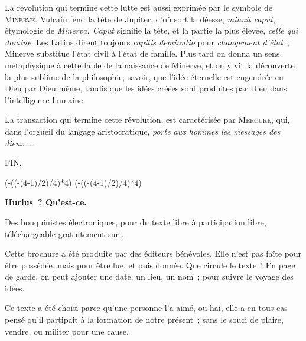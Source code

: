 \documentclass[french,twoside]{book} %
\newcommand\chapterclose{} %
\def\truncdiv#1#2{((#1-(#2-1)/2)/#2)}
\def\moduloop#1#2{(#1-\truncdiv{#1}{#2}*#2)}
\def\modulo#1#2{\number\numexpr\moduloop{#1}{#2}\relax}
\begin{document}
La révolution qui termine cette lutte est aussi exprimée par le symbole de {\scshape Minerve}. Vulcain fend la tête de Jupiter, d’où sort la déesse, {\itshape minuit caput}, étymologie de {\itshape Minerva. Caput} signifie la tête, et la partie la plus élevée, {\itshape celle qui domine}. Les Latins dirent toujours {\itshape capitis deminutio} pour {\itshape changement d’état} ; Minerve substitue l’état civil à l’état de famille. Plus tard on donna un sens métaphysique à cette fable de la naissance de Minerve, et on y vit la découverte la plus sublime de la philosophie, savoir, que l’idée éternelle est engendrée en Dieu par Dieu même, tandis que les idées créées sont produites par Dieu dans l’intelligence humaine.\par
La transaction qui termine cette révolution, est caractérisée par {\scshape Mercure}, qui, dans l’orgueil du langage aristocratique, {\itshape porte aux hommes les messages des dieux……}\par


\begin{raggedleft}FIN.\end{raggedleft}
\chapterclose

\chapterclose

 


\ifbooklet
  \pagestyle{empty}
  \clearpage
  \ifnum\modulo{\value{page}}{4}=0 \hbox{}\newpage\hbox{}\newpage\fi
  \ifnum\modulo{\value{page}}{4}=1 \hbox{}\newpage\hbox{}\newpage\fi


  \hbox{}\newpage
  \ifodd\value{page}\hbox{}\newpage\fi
  {\centering\color{rubric}\bfseries\noindent\large
    Hurlus ? Qu’est-ce.\par
    \bigskip
  }
  \noindent Des bouquinistes électroniques, pour du texte libre à participation libre,
  téléchargeable gratuitement sur \href{https://hurlus.fr}{}.\par
  \bigskip
  \noindent Cette brochure a été produite par des éditeurs bénévoles.
  Elle n’est pas faîte pour être possédée, mais pour être lue, et puis donnée.
  Que circule le texte !
  En page de garde, on peut ajouter une date, un lieu, un nom ; pour suivre le voyage des idées.
  \par

  Ce texte a été choisi parce qu’une personne l’a aimé,
  ou haï, elle a en tous cas pensé qu’il partipait à la formation de notre présent ;
  sans le souci de plaire, vendre, ou militer pour une cause.
  \par
\end{document}
